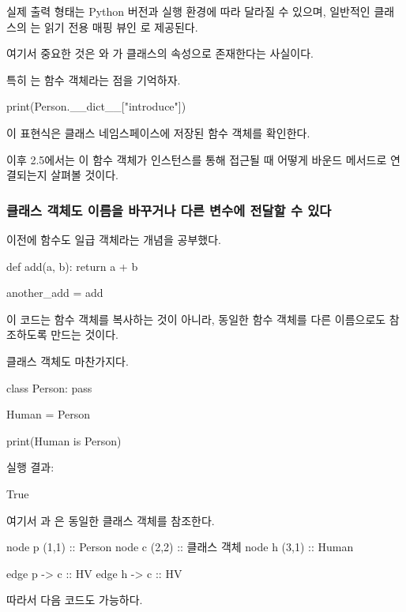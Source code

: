 실제 출력 형태는 Python 버전과 실행 환경에 따라 달라질 수 있으며, 일반적인 클래스의 는 읽기 전용 매핑 뷰인 로 제공된다.

여기서 중요한 것은 와 가 클래스의 속성으로 존재한다는 사실이다.

특히 는 함수 객체라는 점을 기억하자.

\begin{dhkcode}
print(Person.__dict__["introduce"])
\end{dhkcode}

이 표현식은 클래스 네임스페이스에 저장된 함수 객체를 확인한다.

이후 2.5에서는 이 함수 객체가 인스턴스를 통해 접근될 때 어떻게 바운드 메서드로 연결되는지 살펴볼 것이다.

\subsubsection{클래스 객체도 이름을 바꾸거나 다른 변수에 전달할 수 있다}

이전에 함수도 일급 객체라는 개념을 공부했다.

\begin{dhkcode}
def add(a, b):
    return a + b

another_add = add
\end{dhkcode}

이 코드는 함수 객체를 복사하는 것이 아니라, 동일한 함수 객체를 다른 이름으로도 참조하도록 만드는 것이다.

클래스 객체도 마찬가지다.

\begin{dhkcode}
class Person:
    pass

Human = Person

print(Human is Person)
\end{dhkcode}

실행 결과:

\begin{dhkzsh}
True
\end{dhkzsh}

여기서 과 은 동일한 클래스 객체를 참조한다.

\begin{dhkdiagram}[in=6]
node p (1,1) :: Person
node c (2,2) :: 클래스 객체
node h (3,1) :: Human

edge p -> c :: HV
edge h -> c :: HV
\end{dhkdiagram}

따라서 다음 코드도 가능하다.

